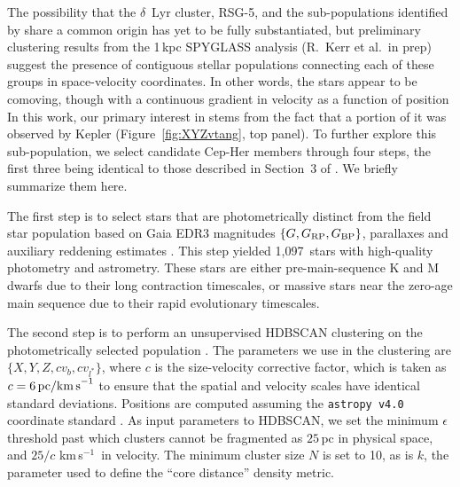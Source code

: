 \documentclass[12pt,twocolumn,tighten,linenumbers,trackchanges]{aastex63}
\newcommand{\npms}{1{,}097} %
\newcommand{\kms}{\,km\,s$^{-1}$}
\begin{document}
The possibility that the $\delta$~Lyr cluster, RSG-5, and the
sub-populations identified by \citet{Kerr2021} share a common origin
has yet to be fully substantiated, but preliminary clustering results
from the 1\,kpc SPYGLASS analysis (R.~Kerr et al.\ in prep) suggest
the presence of contiguous stellar populations connecting each of
these groups in space-velocity coordinates.  In other words, the stars
appear to be comoving, though with a continuous gradient in velocity
as a function of position
In this work, our primary interest in  stems
from the fact that a portion of it was observed by Kepler
(Figure~\ref{fig:XYZvtang}, top panel).  To further explore this
sub-population, we select candidate Cep-Her members through four
steps, the first three being identical to those described in Section~3
of \citet{Kerr2021}.  We briefly summarize them here.

The first step is to select stars that are photometrically distinct
from the field star population based on Gaia EDR3 magnitudes $\{G,
G_{\rm RP}, G_{\rm BP}\}$, parallaxes and auxiliary reddening
estimates \citep{lallement_gaia-2mass_2019}.  This step yielded \npms\
stars with high-quality photometry and astrometry.  These stars are
either pre-main-sequence K and M dwarfs due to their long contraction
timescales, or massive stars near the zero-age main sequence due to
their rapid evolutionary timescales.

The second step is to perform an unsupervised HDBSCAN clustering on
the photometrically selected population
\citep{campello_hierarchical_2015,mcinnes_hdbscan_2017}.  The
parameters we use in the clustering are $\{ X, Y, Z, c v_b, c v_{l^*}
\} $, where $c$ is
the size-velocity corrective factor, which is taken as $c=6\,{\rm pc /
km\,s}^{-1}$ to ensure that the spatial and velocity scales have
identical standard deviations.  Positions are computed assuming the
\texttt{astropy v4.0} coordinate standard
\citep{astropy_2018}. %
As input
parameters to HDBSCAN, we set the minimum $\epsilon$ threshold past
which clusters cannot be fragmented as $25$\,pc in physical space, and
$25/c$\,\kms\ in velocity.  The minimum cluster size $N$ is set to 10, as
is $k$, the parameter used to define the ``core distance'' density
metric. 
\end{document}
